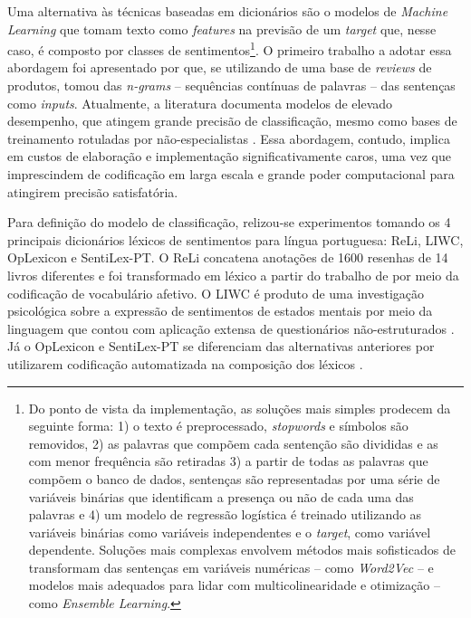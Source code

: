 \documentclass[
12pt,				%
openright,			%
twoside,			%
a4paper,			%
english,			%
french,				%
spanish,			%
brazil				%
]{abntex2}
\begin{document}
Uma alternativa às técnicas baseadas em dicionários são o modelos de \emph{Machine Learning} que tomam texto como \emph{features} na previsão de um \emph{target} que, nesse caso, é composto por classes de sentimentos\footnote{Do ponto de vista da implementação, as soluções mais simples prodecem da seguinte forma: 1) o texto é preprocessado, \emph{stopwords} e símbolos são removidos, 2) as palavras que compõem cada sentenção são divididas e as com menor frequência são retiradas 3) a partir de todas as palavras que compõem o banco de dados, sentenças são representadas por uma série de variáveis binárias que identificam a presença ou não de cada uma das palavras e 4) um modelo de regressão logística é treinado utilizando as variáveis binárias como variáveis independentes e o \emph{target}, como variável dependente. Soluções mais complexas envolvem métodos mais sofisticados de transformam das sentenças em variáveis numéricas -- como \emph{Word2Vec} -- e modelos mais adequados para lidar com multicolinearidade e otimização -- como \emph{Ensemble Learning}.}. O primeiro trabalho a adotar essa abordagem foi apresentado por  que, se utilizando de uma base de \emph{reviews} de produtos, tomou das \emph{n-grams} -- sequências contínuas de palavras -- das sentenças como \emph{inputs}. Atualmente, a literatura documenta modelos de elevado desempenho, que atingem grande precisão de classificação, mesmo como bases de treinamento rotuladas por não-especialistas \cite{howard2018universal, sun2019fine, yang2019xlnet}. Essa abordagem, contudo, implica em custos de elaboração e implementação significativamente caros, uma vez que imprescindem de codificação em larga escala e grande poder computacional para atingirem precisão satisfatória.

Para definição do modelo de classificação, relizou-se experimentos tomando os 4 principais dicionários léxicos de sentimentos para língua portuguesa: ReLi, LIWC, OpLexicon e SentiLex-PT. O ReLi concatena anotações de 1600 resenhas de 14 livros diferentes \cite{freitas2012vampiro, freitas2014sparkling} e foi transformado em léxico a partir do trabalho de  por meio da codificação de vocabulário afetivo. O LIWC é produto de uma investigação psicológica sobre a expressão de sentimentos de estados mentais por meio da linguagem que contou com aplicação extensa de questionários não-estruturados \cite{pennebaker1996cognitive, pennebaker1997linguistic}. Já o OpLexicon e SentiLex-PT se diferenciam das alternativas anteriores por utilizarem codificação automatizada na composição dos léxicos \cite{souza2011construction, carvalho2015sentilex}.
\end{document}
